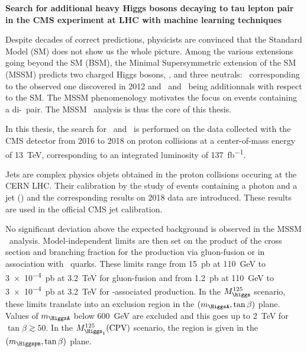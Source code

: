 \begin{center}
\LARGE
\bf
\sffamily
Search for additional heavy Higgs bosons decaying to tau lepton pair in the CMS experiment at LHC with machine learning techniques
\end{center}

\vspace{2\baselineskip}

Despite decades of correct predictions,
physicists are convinced that the Standard Model (SM) does not show us the whole picture.
Among the various extensions going beyond the SM (BSM),
the Minimal Supersymmetric extension of the SM (MSSM)
predicts
two charged Higgs bosons, \Higgspm,
and three neutrals:
\higgs\ corresponding to the observed one discovered in 2012
and
\Higgs\ and \HiggsA\ being additionnals with respect to the SM.
The MSSM phenomenology motivates the focus on events containing a di-\tau\ pair.
The MSSM \HAtoTauTau\ analysis is thus the core of this thesis.
\par
In this thesis,
the search
for \Higgs\ and \HiggsA\ 
is performed
on the data collected
with the CMS detector from 2016 to 2018
on proton collisions
at a center-of-mass energy of \SI{13}{\TeV},
corresponding to an integrated luminosity of \SI{137}{\femto\barn^{-1}}.
\par
Jets are complex physics objets
obtained
in the proton collisions occuring at the CERN LHC.
Their calibration by
the study of events containing a photon and a jet (\Gjet)
and the corresponding results on 2018 data
are introduced.
These results %
are used in the official CMS jet calibration.
\par
No significant deviation above the expected background is observed in the MSSM \HAtoTauTau\ analysis.
Model-independent limits are then set
on the product of the cross section and branching fraction
for the production
via gluon-fusion
or
in association with \quarkb~quarks.
These limits range
from
\SI{15}{\pico\barn} at \SI{110}{\GeV}
to
\SI{3e-4}{\pico\barn} at \SI{3.2}{\TeV}
for gluon-fusion
and from
\SI{1.2}{\pico\barn} at \SI{110}{\GeV}
to
\SI{3e-4}{\pico\barn} at \SI{3.2}{\TeV}
for \quarkb-associated production.
In the $M_{\higgs}^{125}$ scenario,
these limits translate into
an exclusion region in the $(m_{\HiggsA},\tan\beta)$ plane.
Values of $m_{\HiggsA}$ below \SI{600}{\GeV} are excluded
and this goes up to 
\SI{2}{\TeV} for $\tan\beta\gtrsim\num{50}$.
In the $M_{\Higgs_1}^{125}(\text{CPV})$ scenario,
the region is given in the $(m_{\Higgspm},\tan\beta)$ plane.

